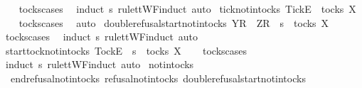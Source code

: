%
\isadelimproof
\ \ %
\endisadelimproof
%
\isatagproof
{}\isamarkupfalse%
\ tocks{\isachardot}cases\ \isamarkupfalse%
\ {\isacharparenleft}induct\ s\ rule{\isacharcolon}ttWF{\isachardot}induct{\isacharcomma}\ auto{\isacharparenright}%
\endisatagproof
{\isafoldproof}%
%
\isadelimproof
\isanewline
%
\endisadelimproof
\isanewline
{}\isamarkupfalse%
\ tick{\isacharunderscore}notin{\isacharunderscore}tocks{\isacharcolon}\ {\isachardoublequoteopen}{\isacharbrackleft}{\isacharbrackleft}Tick{\isacharbrackright}\isactrlsub E{\isacharbrackright}\ {\isasymnotin}\ tocks\ X{\isachardoublequoteclose}\isanewline
%
\isadelimproof
\ \ %
\endisadelimproof
%
\isatagproof
{}\isamarkupfalse%
\ tocks{\isachardot}cases\ \isamarkupfalse%
\ {\isacharparenleft}auto{\isacharparenright}%
\endisatagproof
{\isafoldproof}%
%
\isadelimproof
\isanewline
%
\endisadelimproof
\isanewline
{}\isamarkupfalse%
\ double{\isacharunderscore}refusal{\isacharunderscore}start{\isacharunderscore}notin{\isacharunderscore}tocks{\isacharcolon}\ {\isachardoublequoteopen}{\isacharbrackleft}Y{\isacharbrackright}\isactrlsub R\ {\isacharhash}\ {\isacharbrackleft}Z{\isacharbrackright}\isactrlsub R\ {\isacharhash}\ s\ {\isasymnotin}\ tocks\ X{\isachardoublequoteclose}\isanewline
%
\isadelimproof
\ \ %
\endisadelimproof
%
\isatagproof
{}\isamarkupfalse%
\ tocks{\isachardot}cases\ \isamarkupfalse%
\ {\isacharparenleft}induct\ s\ rule{\isacharcolon}ttWF{\isachardot}induct{\isacharcomma}\ auto{\isacharparenright}%
\endisatagproof
{\isafoldproof}%
%
\isadelimproof
\isanewline
%
\endisadelimproof
\isanewline
{}\isamarkupfalse%
\ start{\isacharunderscore}tock{\isacharunderscore}notin{\isacharunderscore}tocks{\isacharcolon}\ {\isachardoublequoteopen}{\isacharbrackleft}Tock{\isacharbrackright}\isactrlsub E\ {\isacharhash}\ s\ {\isasymnotin}\ tocks\ X{\isachardoublequoteclose}\isanewline
%
\isadelimproof
\ \ %
\endisadelimproof
%
\isatagproof
{}\isamarkupfalse%
\ tocks{\isachardot}cases\ \isamarkupfalse%
\ {\isacharparenleft}induct\ s\ rule{\isacharcolon}ttWF{\isachardot}induct{\isacharcomma}\ auto{\isacharparenright}%
\endisatagproof
{\isafoldproof}%
%
\isadelimproof
\isanewline
%
\endisadelimproof
\isanewline
{}\isamarkupfalse%
\ notin{\isacharunderscore}tocks\ {\isacharequal}\ \isanewline
\ \ end{\isacharunderscore}refusal{\isacharunderscore}notin{\isacharunderscore}tocks\ refusal{\isacharunderscore}notin{\isacharunderscore}tocks\ double{\isacharunderscore}refusal{\isacharunderscore}start{\isacharunderscore}notin{\isacharunderscore}tocks\isanewline
